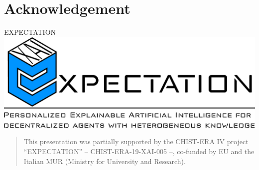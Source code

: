 \documentclass[presentation]{beamer}\mode<presentation>{\usetheme{AMSBolognaFC}}
\begin{document}
\section*{}

\frame{\titlepage}

\section*{\refname}

\begin{frame}{\refname}
    \scriptsize
    
    
\end{frame}

\section*{Acknowledgement}

\begin{frame}{EXPECTATION}
\includegraphics[width=\linewidth]{./figures/expectation-banner.pdf}

\bigskip

\footnotesize\begin{quote}
This presentation was partially supported by the CHIST-ERA IV project ``EXPECTATION'' -- CHIST-ERA-19-XAI-005 --, co-funded by EU and the Italian MUR (Ministry for University and Research).
\end{quote}

\end{frame}


\end{document}
